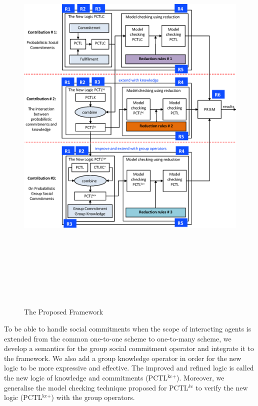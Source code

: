  \begin{figure}[H]
                \begin{center}
                \includegraphics[width=16cm, height=20cm]{chap1/img/thesis-new.eps}
                \end{center}
                \caption{The Proposed Framework }
                \label{fig:proposed-framework}
    \end{figure}



To be able to handle social commitments when the scope of interacting agents is extended from the common one-to-one scheme to one-to-many scheme, we develop a semantics for the group social commitment operator and integrate it to the framework. We also add a group knowledge operator in order for the new logic to be more expressive and effective. The improved and refined logic is called the new logic of knowledge and commitments (PCTL$^{\textrm{kc+}}$). Moreover, we generalise the model checking technique proposed for PCTL$^{kc}$ to verify the new logic (PCTL$^{\textrm{kc+}}$) with the group operators.

